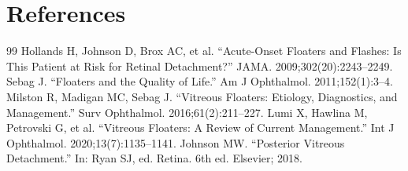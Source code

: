 \section*{References}
\begin{thebibliography}{99}
 Hollands H, Johnson D, Brox AC, et al. ``Acute-Onset Floaters and Flashes: Is This Patient at Risk for Retinal Detachment?'' JAMA. 2009;302(20):2243--2249.
 Sebag J. ``Floaters and the Quality of Life.'' Am J Ophthalmol. 2011;152(1):3--4.
 Milston R, Madigan MC, Sebag J. ``Vitreous Floaters: Etiology, Diagnostics, and Management.'' Surv Ophthalmol. 2016;61(2):211--227.
 Lumi X, Hawlina M, Petrovski G, et al. ``Vitreous Floaters: A Review of Current Management.'' Int J Ophthalmol. 2020;13(7):1135--1141.
 Johnson MW. ``Posterior Vitreous Detachment.'' In: Ryan SJ, ed. Retina. 6th ed. Elsevier; 2018.
\end{thebibliography}

